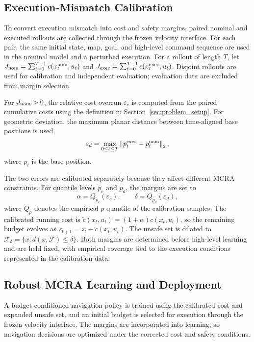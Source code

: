 \documentclass[conference]{IEEEtran}
\begin{document}
\subsection{Execution-Mismatch Calibration}
\label{sec:execution_calibration}
To convert execution mismatch into cost and safety margins, paired nominal and
executed rollouts are collected through the frozen velocity interface. For each
pair, the same initial state, map, goal, and high-level command sequence are used
in the nominal model and a perturbed execution. For a rollout of length $T$,
let
$J_{\rm nom}=\sum_{t=0}^{T-1}c(x_t^{\rm nom},u_t)$ and
$J_{\rm exec}=\sum_{t=0}^{T-1}c(x_t^{\rm exec},u_t)$. Disjoint rollouts are used
for calibration and independent evaluation; evaluation data are excluded from margin selection.

For $J_{\rm nom}>0$, the relative cost overrun $\varepsilon_c$ is computed from
the paired cumulative costs using the definition in Section~\ref{sec:problem_setup}. For geometric
deviation, the maximum planar distance between time-aligned base positions is used,
\begin{equation}
\varepsilon_d=\max_{0\leq t\leq T} \left\|p_t^{\rm exec}-p_t^{\rm nom}\right\|_2,
\end{equation}
where $p_t$ is the base position.

The two errors are calibrated separately because they affect different MCRA
constraints. For quantile levels $p_c$ and $p_d$, the margins are set to
\begin{equation}
\alpha=Q_{p_c}(\varepsilon_c),\qquad
\delta=Q_{p_d}(\varepsilon_d),
\end{equation}
where $Q_p$ denotes the empirical $p$-quantile of the calibration samples. The
calibrated running cost is
$\tilde c(x_t,u_t)=(1+\alpha)c(x_t,u_t)$, so the remaining budget evolves as
$z_{t+1}=z_t-\tilde c(x_t,u_t)$. The unsafe set is dilated to
$\mathcal{F}_\delta=\{x:d(x,\mathcal{F})\leq\delta\}$. Both margins are determined
before high-level learning and are held fixed, with empirical coverage tied to the
execution conditions represented in the calibration data.

\subsection{Robust MCRA Learning and Deployment}
A budget-conditioned navigation policy is trained using the calibrated cost and
expanded unsafe set, and an initial budget is selected for execution through the
frozen velocity interface. The margins are incorporated into learning, so navigation
decisions are optimized under the corrected cost and safety conditions.
\end{document}
